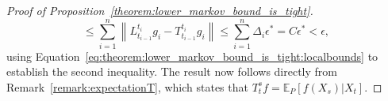 \documentclass[10pt,a4paper]{paper}
\theoremstyle{definition}
\newcommand{\rateset}{\mathcal{Q}}
\newcommand{\lrate}{\underline{Q}}
\newcommand{\norm}[1]{\left\lVert #1 \right\rVert}
\begin{document}
\begin{proof}[Proof of Proposition~\ref{theorem:lower_markov_bound_is_tight}]
\begin{equation*}
\leq \sum_{i=1}^{n} \norm{L_{t_{i-1}}^{t_i}g_i - T_{t_{i-1}}^{t_i}g_i}\leq\sum_{i=1}^n\Delta_i\epsilon^*=C\epsilon^*<\epsilon,
\end{equation*}
using Equation~\eqref{eq:theorem:lower_markov_bound_is_tight:localbounds} to establish the second inequality. The result now follows directly from Remark~\ref{remark:expectationT}, which states that $T_t^sf=\mathbb{E}_P[f(X_s)\vert X_t]$.

\end{proof}
\end{document}
